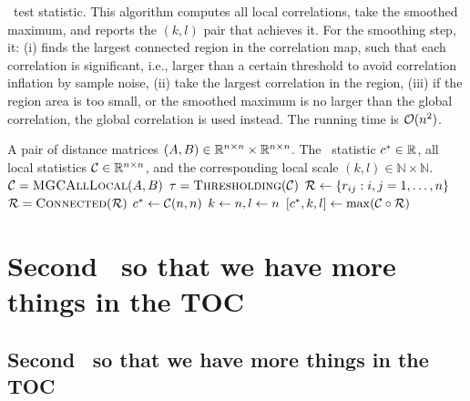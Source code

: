 \documentclass{article}
\begin{document}
\begin{algorithm}
\caption{\Mgc~test statistic. This algorithm computes all local correlations, take the smoothed maximum, and reports the $(k,l)$ pair that achieves it. For the smoothing step, it: (i) finds the largest connected region in the correlation map, such that each correlation is significant, i.e., larger than a certain threshold to avoid correlation inflation by sample noise, (ii) take the largest correlation in the region, (iii) if the region area is too small, or the smoothed maximum is no larger than the global correlation, the global correlation is used instead. The running time is $\mathcal{O}(n^2)$.}
\label{alg:sample_mgc}
\begin{algorithmic}[1]
\Require A pair of distance matrices $(A, B) \in \mathbb{R}^{n \times n} \times \mathbb{R}^{n \times n}$.
\Ensure The \Mgc~statistic $c^{*} \in \mathbb{R}$, all local statistics $\mathcal{C} \in \mathbb{R}^{n \times n}$, and the corresponding local scale $(k,l) \in \mathbb{N} \times \mathbb{N}$.
\State $\mathcal{C}=\textsc{MGCAllLocal}(A,B)$ 
\State $\tau = \textsc{Thresholding}(\mathcal{C})$ 
 
\State $\mathcal{R} \leftarrow \{r_{ij} : i,j = 1,\ldots, n\}$ 
\State $\mathcal{R}  = \textsc{Connected}(\mathcal{R} )$ 
\State $c^{*} \leftarrow \mathcal{C}(n,n)$ 
\State $k \leftarrow n, l \leftarrow n$
 
\State $[c^{*},k,l] \leftarrow \max (\mathcal{C} \circ \mathcal{R})$ 
\EndIf
\EndFunction
\end{algorithmic}
\end{algorithm}



\section{Second \textsection\, so that we have more things in the TOC}
\lipsum[4]
\subsection{Second \textsection\textsection\, so that we have more things in the TOC}
\lipsum[5]
\end{document}
